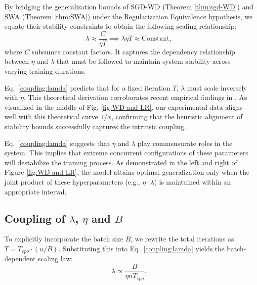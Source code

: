 By bridging the generalization bounds of SGD-WD (Theorem \ref{thm:sgd-WD}) and SWA (Theorem \ref{thm:SWA}) under the Regularization Equivalence hypothesis, we equate their stability constraints to obtain the following scaling relationship:
\begin{equation}\label{coupling:lamda}
\lambda \approx \frac{C}{\eta T} \implies \lambda \eta T \approx \text{Constant},
\end{equation}
where $C$ subsumes constant factors. It captures the dependency relationship between $\eta$ and $\lambda$ that must be followed to maintain system stability across varying training durations.

\begin{remark}
Eq.~\eqref{coupling:lamda} predicts that for a fixed iteration $T$, $\lambda$ must scale inversely with $\eta$. This theoretical derivation corroborates recent empirical findings in \cite{wang2025setadamwsweightdecay,bergsma2025powerlinesscalinglaws}. As visualized in the middle of Fig. \ref{fig:WD and LR}, our experimental data aligns well with this theoretical curve $1/x$, confirming that the heuristic alignment of stability bounds successfully captures the intrinsic coupling.
\end{remark}

\begin{remark}
Eq.~\eqref{coupling:lamda} suggests that $\eta$ and $\lambda$ play commensurate roles in the system. This implies that extreme concurrent configurations of these parameters will destabilize the training process. As demonstrated in the left and right of Figure \ref{fig:WD and LR}, the model attains optimal generalization only when the joint product of these hyperparameters (e.g., $\eta \cdot \lambda$) is maintained within an appropriate interval.
\end{remark}

 \subsection{Coupling of $\lambda$, $\eta$ and $B$}
To explicitly incorporate the batch size $B$, we rewrite the total iterations as $T = T_{epo} \cdot (n/B)$. Substituting this into Eq.~\eqref{coupling:lamda} yields the batch-dependent scaling law:
\begin{equation}\label{coupling:Batch}
\lambda \propto \frac{B}{\eta n T_{epo}}.
\end{equation}

